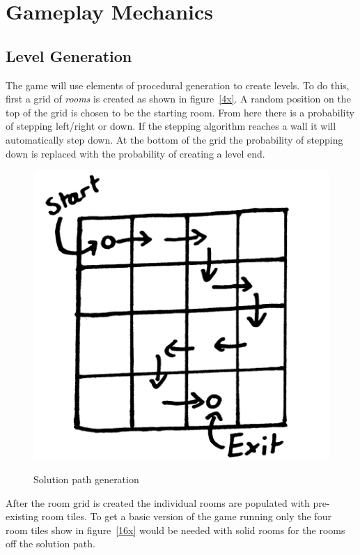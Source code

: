 
\section{Gameplay Mechanics}

\subsection{Level Generation}

The game will use elements of procedural generation to create levels. To do this, first a grid of \textit{rooms} is created as shown in figure~\ref{4x}. A random position on the top of the grid is chosen to be the starting room. From here there is a probability of stepping left/right or down. If the stepping algorithm reaches a wall it will automatically step down. At the bottom of the grid the probability of stepping down is replaced with the probability of creating a level end.

\begin{figure}[ht]
\centering
\includegraphics[scale=0.2, trim = 0cm 0cm 0cm 0cm]{images/4x4}
\label{fig:4x}
\caption{Solution path generation}
\end{figure}

After the room grid is created the individual rooms are populated with pre-existing room tiles. To get a basic version of the game running only the four room tiles show in figure~\ref{16x} would be needed with solid rooms for the rooms off the solution path.

